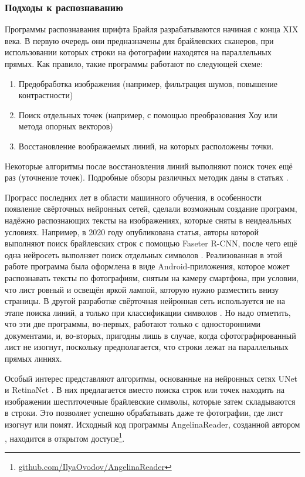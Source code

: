 \documentclass{main.tex}[subfiles]
\begin{document}
\subsubsection{Подходы к распознаванию}
Программы распознавания шрифта Брайля разрабатываются начиная с конца XIX века.
В первую очередь они предназначены для брайлевских сканеров, при использовании которых строки на фотографии находятся на параллельных прямых.
Как правило, такие программы работают по следующей схеме:
\begin{enumerate}[noitemsep]
    \item Предобработка изображения (например, фильтрация шумов, повышение контрастности)
    \item Поиск отдельных точек (например, с помощью преобразования Хоу или метода опорных векторов)
    \item Восстановление воображаемых линий, на которых расположены точки.
\end{enumerate}
Некоторые алгоритмы после восстановления линий выполняют поиск точек ещё раз (уточнение точек).
Подробные обзоры различных методик даны в статьях \cite{isayed2015review, shokat2020review}.

Програсс последних лет в области машинного обучения, в особенности появление свёрточных нейронных сетей, сделали возможным создание программ, надёжно распознающих тексты на изображениях, которые сняты в неидеальных условиях.
Например, в 2020 году опубликована статья, авторы которой выполняют поиск брайлевских строк с помощью Faseter R-CNN, после чего ещё одна нейросеть выполняет поиск отдельных символов \cite{baumgartner2020app}.
Реализованная в этой работе программа была оформлена в виде Android-приложения, которое может распознавать тексты по фотографиям, снятым на камеру смартфона, при условии, что лист ровный и освещён яркой лампой, которую нужно разместить внизу страницы.
В другой разработке свёрточная нейронная сеть используется не на этапе поиска линий, а только при классификации символов \cite{alsalman2021}.
Но надо отметить, что эти две программы, во-первых, работают только с односторонними документами, и, во-вторых, пригодны лишь в случае, когда сфотографированный лист не изогнут, поскольку предполагается, что строки лежат на параллельных прямых линиях.

Особый интерес представляют алгоритмы, основанные на нейронных сетях UNet \cite{li2020braunet} и RetinaNet \cite{ovodov2020, ovodov2021}.
В них предлагается вместо поиска строк или точек находить на изображении шеститочечные брайлевские символы, которые затем складываются в строки.
Это позволяет успешно обрабатывать даже те фотографии, где лист изогнут или помят.
Исходный код программы AngelinaReader, созданной автором \cite{ovodov2020, ovodov2021}, находится в открытом доступе\footnote{\href{https://github.com/IlyaOvodov/AngelinaReader}{github.com/IlyaOvodov/AngelinaReader}}.
\end{document}
